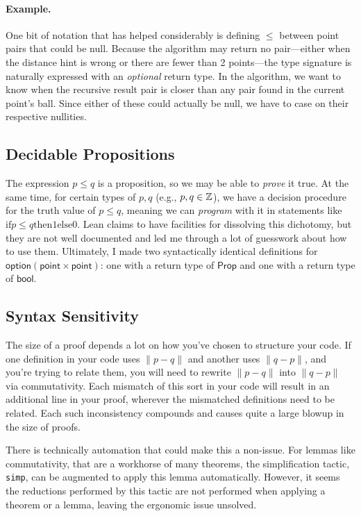 \documentclass{article}
\begin{document}
\paragraph{Example.}
One bit of notation that has helped considerably is defining $\leq$ between point pairs that could be null.
Because the algorithm may return no pair---either when the distance hint is wrong or there are fewer than 2 points---the type signature is naturally expressed with an \textit{optional} return type.
In the algorithm, we want to know when the recursive result pair is closer than any pair found in the current point's ball.
Since either of these could actually be null, we have to case on their respective nullities.


\subsection{Decidable Propositions}
The expression $p \leq q$ is a proposition, so we may be able to \textit{prove} it true.
At the same time, for certain types of $p, q$ (e.g., $p, q \in \mathbb{Z}$), we have a decision procedure for the truth value of $p \leq q$, meaning we can \textit{program} with it in statements like $\text{if} p \leq q \text{then} 1 \text{else} 0$.
Lean claims to have facilities for dissolving this dichotomy, but they are not well documented and led me through a lot of guesswork about how to use them.
Ultimately, I made two syntactically identical definitions for $\mathsf{option} (\mathsf{point} \times \mathsf{point})$: one with a return type of $\mathsf{Prop}$ and one with a return type of $\mathsf{bool}$.

\subsection{Syntax Sensitivity}
The size of a proof depends a lot on how you've chosen to structure your code.
If one definition in your code uses $\| p - q \|$ and another uses $\| q - p \|$, and you're trying to relate them, you will need to rewrite $\| p - q \|$ into $\| q - p \|$ via commutativity.
Each mismatch of this sort in your code will result in an additional line in your proof, wherever the mismatched definitions need to be related.
Each such inconsistency compounds and causes quite a large blowup in the size of proofs.

There is technically automation that could make this a non-issue.
For lemmas like commutativity, that are a workhorse of many theorems, the simplification tactic, \texttt{simp}, can be augmented to apply this lemma automatically.
However, it seems the reductions performed by this tactic are not performed when applying a theorem or a lemma, leaving the ergonomic issue unsolved.
\end{document}
